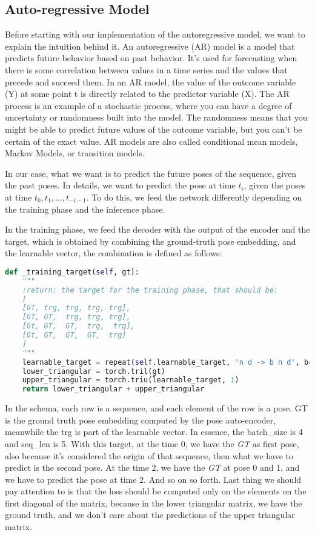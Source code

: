 \subsection{Auto-regressive Model}\label{subsec:auto-regressive-model}
Before starting with our implementation of the autoregressive model, we want to explain the intuition behind it.
An autoregressive (AR) model is a model that predicts future behavior based on past behavior.
It's used for forecasting when there is some correlation between values in a time series and the values that precede and succeed them.
In an AR model, the value of the outcome variable (Y) at some point t is directly related to the predictor variable (X).
The AR process is an example of a stochastic process, where you can have a degree of uncertainty or randomness built into the model.
The randomness means that you might be able to predict future values of the outcome variable, but you can't be certain of the exact value.
AR models are also called conditional mean models, Markov Models, or transition models.

In our case, what we want is to predict the future poses of the sequence, given the past poses.
In details, we want to predict the pose at time $t_i$, given the poses at time $t_0, t_1, \dots, t_{-i-1}$.
To do this, we feed the network differently depending on the training phase and the inference phase.

In the training phase, we feed the decoder with the output of the encoder and the target, which is obtained by combining the ground-truth pose embedding, and the learnable vector, the combination is defined as follows:
\begin{lstlisting}[captionpos=b, label={lst:lst-training-target}, caption={Training target}, language=Python]
def _training_target(self, gt):
    """
    :return: the target for the training phase, that should be:
    [
    [GT, trg, trg, trg, trg],
    [GT, GT,  trg, trg, trg],
    [Gt, GT,  GT,  trg,  trg],
    [Gt, GT,  GT,  GT,  trg]
    ]
    """
    learnable_target = repeat(self.learnable_target, 'n d -> b n d', b=gt.shape[0])
    lower_triangular = torch.tril(gt)
    upper_triangular = torch.triu(learnable_target, 1)
    return lower_triangular + upper_triangular
\end{lstlisting}
In the schema, each row is a sequence, and each element of the row is a pose.
GT is the ground truth pose embedding computed by the pose auto-encoder, meanwhile the trg is part of the learnable vector.
In essence, the batch\_size is 4 and seq\_len is 5.
With this target, at the time 0, we have the \textit{GT} as first pose, also because it's considered the origin of that sequence, then what we have to predict is the second pose.
At the time 2, we have the \textit{GT} at pose 0 and 1, and we have to predict the pose at time 2.
And so on so forth.
Last thing we should pay attention to is that the loss should be computed only on the elements on the first diagonal of the matrix, because in the lower triangular matrix, we have the ground truth, and we don't care about the predictions of the upper triangular matrix.

